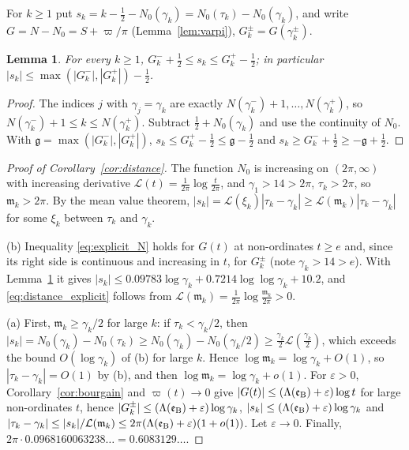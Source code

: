 \documentclass[11pt,a4paper]{article}
\makeatletter
\numberwithin{equation}{section}
\DeclareRobustCommand{\CGref}[1]{\ref{#1}}
\DeclareRobustCommand{\CGeqref}[1]{\eqref{#1}}
\let\CG@origref\ref
\let\CG@origeqref\eqref
\newcommand{\CG@gettip}[1]{\@ifundefined{CGTip@#1}{#1}{\csname CGTip@#1\endcsname}}
\DeclareRobustCommand{\CGref}[1]{\pdftooltip{\CG@origref{#1}}{\CG@gettip{#1}}}
\DeclareRobustCommand{\CGeqref}[1]{\pdftooltip{\CG@origeqref{#1}}{\CG@gettip{#1}}}
\newtheorem{lemma}[theorem]{Lemma}
\theoremstyle{definition}
\theoremstyle{remark}
\newcommand{\Nz}{N_0} %
\newcommand{\lL}{\mathcal L}
\newcommand{\eB}{\mathfrak e_{\rm B}}
\makeatother
\begin{document}
For $k\ge1$ put $s_k=k-\frac12-\Nz(\gamma_k)=\Nz(\tau_k)-\Nz(\gamma_k)$, and write $G=N-\Nz=S+\varpi/\pi$ (Lemma~\CGref{lem:varpi}), $G_k^\pm=G(\gamma_k^\pm)$.

\begin{lemma}\label{lem:s_bounds}
For every $k\ge1$, $G_k^-+\frac12\le s_k\le G_k^+-\frac12$; in particular $|s_k|\le\max(|G_k^-|,|G_k^+|)-\frac12$.
\end{lemma}

\begin{proof}
The indices $j$ with $\gamma_j=\gamma_k$ are exactly $N(\gamma_k^-)+1,\dots,N(\gamma_k^+)$, so $N(\gamma_k^-)+1\le k\le N(\gamma_k^+)$. Subtract $\frac12+\Nz(\gamma_k)$ and use the continuity of $\Nz$. With $\mathfrak g=\max(|G_k^-|,|G_k^+|)$, $s_k\le G_k^+-\frac12\le\mathfrak g-\frac12$ and $s_k\ge G_k^-+\frac12\ge-\mathfrak g+\frac12$.
\end{proof}

\begin{proof}[Proof of Corollary~\ref{cor:distance}]
The function $\Nz$ is increasing on $(2\pi,\infty)$ with increasing derivative $\lL(t)=\frac1{2\pi}\log\frac t{2\pi}$, and $\gamma_1>14>2\pi$, $\tau_k>2\pi$, so $\mathfrak m_k>2\pi$. By the mean value theorem, $|s_k|=\lL(\xi_k)|\tau_k-\gamma_k|\ge\lL(\mathfrak m_k)|\tau_k-\gamma_k|$ for some $\xi_k$ between $\tau_k$ and $\gamma_k$.

(b) Inequality \CGeqref{eq:explicit_N} holds for $G(t)$ at non-ordinates $t\ge e$ and, since its right side is continuous and increasing in $t$, for $G_k^\pm$ (note $\gamma_k>14>e$). With Lemma~\CGref{lem:s_bounds} it gives $|s_k|\le0.09783\log\gamma_k+0.7214\log\log\gamma_k+10.2$, and \CGeqref{eq:distance_explicit} follows from $\lL(\mathfrak m_k)=\frac1{2\pi}\log\frac{\mathfrak m_k}{2\pi}>0$.

(a) First, $\mathfrak m_k\ge\gamma_k/2$ for large $k$: if $\tau_k<\gamma_k/2$, then $|s_k|=\Nz(\gamma_k)-\Nz(\tau_k)\ge\Nz(\gamma_k)-\Nz(\gamma_k/2)\ge\frac{\gamma_k}2\lL(\frac{\gamma_k}2)$, which exceeds the bound $O(\log\gamma_k)$ of (b) for large $k$. Hence $\log\mathfrak m_k=\log\gamma_k+O(1)$, so $|\tau_k-\gamma_k|=O(1)$ by (b), and then $\log\mathfrak m_k=\log\gamma_k+o(1)$. For $\varepsilon>0$, Corollary~\CGref{cor:bourgain} and $\varpi(t)\to0$ give $|G(t)|\le(\Lambda(\eB)+\varepsilon)\log t$ for large non-ordinates $t$, hence $|G_k^\pm|\le(\Lambda(\eB)+\varepsilon)\log\gamma_k$, $|s_k|\le(\Lambda(\eB)+\varepsilon)\log\gamma_k$ and $|\tau_k-\gamma_k|\le|s_k|/\lL(\mathfrak m_k)\le2\pi(\Lambda(\eB)+\varepsilon)(1+o(1))$. Let $\varepsilon\to0$. Finally, $2\pi\cdot0.0968160063238\ldots=0.6083129\ldots$.
\end{proof}
\end{document}
